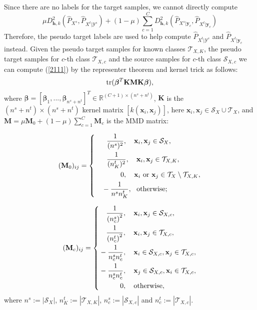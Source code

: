 \documentclass[journal]{IEEEtran}
\begin{document}
Since there are no labels for the target samples, we cannot directly compute 
\begin{equation}\label{2111}
\mu D_{{\bm h},k}^2(\widehat{P}_{X^s},\widehat{P}_{X^t|\mathcal{Y}^s})+(1-\mu)\sum_{c=1}^CD_{{\bm h},k}^2(\widehat{P}_{X^s|{\mathbf{y}}_c},\widehat{P}_{X^t|{\mathbf{y}}_c})
\end{equation}
Therefore, the pseudo target labels are used to help compute $\widehat{P}_{X^t|\mathcal{Y}^s}$ and $\widehat{P}_{X^t|{\mathbf{y}}_c}$ instead.
Given the pseudo target samples for known classes $\mathcal{T}_{X,K}$, the pseudo target samples for $c$-th class $\mathcal{T}_{X,c}$ and the source samples for $c$-th class $\mathcal{S}_{X,c}$
we can compute (\ref{2111}) by  the representer theorem and kernel trick as follows:
\begin{equation}\label{10}
{\rm tr}({\bm {\bm \beta}}^T\mathbf{KMK}{\bm {\bm \beta}}),
\end{equation}
where ${\bm {\bm \beta}}=[{\bm {\bm \beta}}_1,...,{\bm {\bm \beta}}_{n^s+n^t}]^T  \in \mathbb{R}^{{(C+1)}\times {(n^s+n^t)}}$, $\mathbf{K}$ is the ${(n^s+n^t)}\times{(n^s+n^t)}$ kernel matrix $[k(\mathbf{x}_i,\mathbf{x}_j)]$, here $\mathbf{x}_i,\mathbf{x}_j \in \mathcal{S}_X\cup \mathcal{T}_X$, and $\mathbf{M}=\mu \mathbf{M}_0+(1-\mu)\sum_{c=1}^{C}\mathbf{M}_c$ is the MMD matrix:

\begin{equation*}
(\mathbf{M}_0)_{ij}=\left\{
\begin{aligned}
&~~~~~\frac{1}{(n^s)^2},~~~\mathbf{x}_i, \mathbf{x}_j \in \mathcal{S}_X, \\
&~~~~~\frac{1}{(n^t_K)^2},~~~\mathbf{x}_i, \mathbf{x}_j\in \mathcal{T}_{X,K},\\
&~~~~~~~~~~~0,  ~~~\mathbf{x}_i~{\rm or}~\mathbf{x}_j\in \mathcal{T}_X \setminus \mathcal{T}_{X,K},\\
&~~~-\frac{1}{n^s{n}^t_K},~~\rm otherwise;
\end{aligned}
\right.
\end{equation*}


\begin{equation*}
(\mathbf{M}_c)_{ij}=\left\{
\begin{aligned}
&~~~\frac{1}{{(n^s_c)}^2},~~~ \mathbf{x}_i, \mathbf{x}_j \in\mathcal{S}_{X,c},\\
&~~~\frac{1}{{(n^t_c)}^2}, ~~~\mathbf{x}_i, \mathbf{x}_j\in \mathcal{T}_{X,c},\\
&-\frac{1}{n^s_c n^t_c},~~~\mathbf{x}_i \in\mathcal{S}_{X,c}, \mathbf{x}_j\in \mathcal{T}_{X,c},\\
&-\frac{1}{n^s_c n^t_c},~~~\mathbf{x}_j\in\mathcal{S}_{X,c}, \mathbf{x}_i\in \mathcal{T}_{X,c},\\
&~~~~~~~~~0,~~~\rm otherwise,
\end{aligned}
\right.
\end{equation*}
where $n^s:=|\mathcal{S}_X|$, $n^t_K:=|\mathcal{T}_{X,K}|$, $n^s_c:=|\mathcal{S}_{X,c}|$ and $n^t_c:=|\mathcal{T}_{X,c}|$.
 
\end{document}

